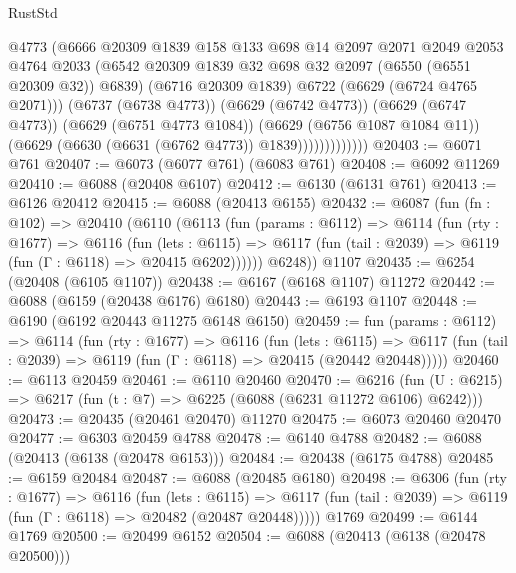 \begin{lexlean}{RustStd}
\begin{coremodule}
                          @4773
                          (@6666
                            @20309
                            @1839
                            @158
                            @133
                            @698
                            @14
                            @2097
                            @2071
                            @2049
                            @2053
                            @4764
                            @2033
                            (@6542 @20309 @1839 @32 @698 @32 @2097 (@6550 (@6551 @20309 @32)) @6839)
                            (@6716 @20309 @1839)
                            @6722
                            (@6629 (@6724 @4765 @2071)))
                          (@6737 (@6738 @4773))
                          (@6629 (@6742 @4773))
                          (@6629 (@6747 @4773))
                          (@6629 (@6751 @4773 @1084))
                          (@6629 (@6756 @1087 @1084 @11))
                          (@6629 (@6630 (@6631 (@6762 @4773)) @1839)))))))))))))
@20403 := @6071 @761
@20407 := @6073 (@6077 @761) (@6083 @761)
@20408 := @6092 @11269
@20410 := @6088 (@20408 @6107)
@20412 := @6130 (@6131 @761)
@20413 := @6126 @20412
@20415 := @6088 (@20413 @6155)
@20432 := @6087
    (fun (fn : @102) =>
    @20410
      (@6110
        (@6113
          (fun (params : @6112) =>
          @6114
            (fun (rty : @1677) =>
            @6116
              (fun (lets : @6115) =>
              @6117 (fun (tail : @2039) => @6119 (fun (Γ : @6118) => @20415 @6202))))))
        @6248))
    @1107
@20435 := @6254 (@20408 (@6105 @1107))
@20438 := @6167 (@6168 @1107) @11272
@20442 := @6088 (@6159 (@20438 @6176) @6180)
@20443 := @6193 @1107
@20448 := @6190 (@6192 @20443 @11275 @6148 @6150)
@20459 := fun (params : @6112) =>
  @6114
    (fun (rty : @1677) =>
    @6116
      (fun (lets : @6115) =>
      @6117 (fun (tail : @2039) => @6119 (fun (Γ : @6118) => @20415 (@20442 @20448)))))
@20460 := @6113 @20459
@20461 := @6110 @20460
@20470 := @6216
    (fun (U : @6215) => @6217 (fun (t : @7) => @6225 (@6088 (@6231 @11272 @6106) @6242)))
@20473 := @20435 (@20461 @20470) @11270
@20475 := @6073 @20460 @20470
@20477 := @6303 @20459 @4788
@20478 := @6140 @4788
@20482 := @6088 (@20413 (@6138 (@20478 @6153)))
@20484 := @20438 (@6175 @4788)
@20485 := @6159 @20484
@20487 := @6088 (@20485 @6180)
@20498 := @6306
    (fun (rty : @1677) =>
    @6116
      (fun (lets : @6115) =>
      @6117 (fun (tail : @2039) => @6119 (fun (Γ : @6118) => @20482 (@20487 @20448)))))
    @1769
@20499 := @6144 @1769
@20500 := @20499 @6152
@20504 := @6088 (@20413 (@6138 (@20478 @20500)))

\end{coremodule}
\end{lexlean}
